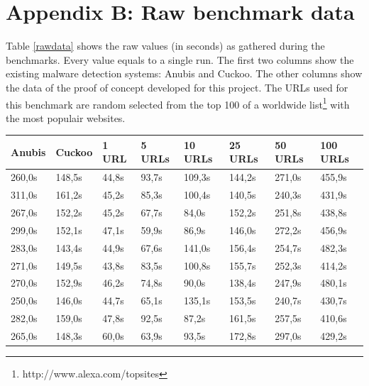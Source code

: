 \documentclass{scrartcl}
\begin{document}
\clearpage

\section*{Appendix B: Raw benchmark data}

Table \ref{rawdata} shows the raw values (in seconds) as gathered during the benchmarks. Every value equals to a single run. The first two columns show the existing malware detection systems: Anubis and Cuckoo. The other columns show the data of the proof of concept developed for this project. The URLs used for this benchmark are random selected from the top 100 of a worldwide list\footnote{http://www.alexa.com/topsites} with the most populair websites.

\begin{table}[h]
\begin{tabular}{@{}llllllll@{}}
\toprule
Anubis  & Cuckoo  & 1 URL       & 5 URLs      & 10 URLs      & 25 URLs      & 50 URLs      & 100 URLs     \\ \midrule
260,0s  & 148,5s  & 44,8s       & 93,7s       & 109,3s       & 144,2s       & 271,0s       & 455,9s        \\
311,0s  & 161,2s  & 45,2s       & 85,3s       & 100,4s       & 140,5s       & 240,3s       & 431,9s        \\
267,0s  & 152,2s  & 45,2s       & 67,7s       & 84,0s        & 152,2s       & 251,8s       & 438,8s        \\
299,0s  & 152,1s  & 47,1s       & 59,9s       & 86,9s        & 146,0s       & 272,2s       & 456,9s        \\
283,0s  & 143,4s  & 44,9s       & 67,6s       & 141,0s       & 156,4s       & 254,7s       & 482,3s        \\
271,0s  & 149,5s  & 43,8s       & 83,5s       & 100,8s       & 155,7s       & 252,3s       & 414,2s        \\
270,0s  & 152,9s  & 46,2s       & 74,8s       & 90,0s        & 138,4s       & 247,9s       & 480,1s        \\
250,0s  & 146,0s  & 44,7s       & 65,1s       & 135,1s       & 153,5s       & 240,7s       & 430,7s        \\
282,0s  & 159,0s  & 47,8s       & 92,5s       & 87,2s        & 161,5s       & 257,5s       & 410,6s        \\
265,0s  & 148,3s  & 60,0s       & 63,9s       & 93,5s        & 172,8s       & 297,0s       & 429,2s        \\

\end{tabular}
\end{table}
\end{document}
